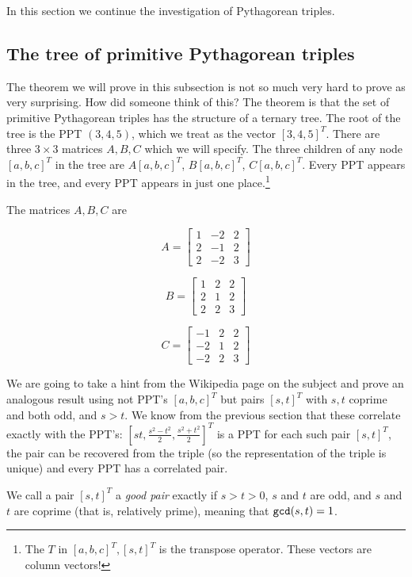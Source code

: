 \documentclass[12pt]{article}
\begin{document}
In this section we continue the investigation of Pythagorean triples.

\subsection{The tree of primitive Pythagorean triples}

The theorem we will prove in this subsection is not so much very hard to prove as very surprising.   How did someone think of this?   The theorem is that the set of primitive Pythagorean triples has the structure of a ternary tree.   The root of the tree is the PPT $(3,4,5)$, which we treat as the vector $[3,4,5]^T$.  There are three $3 \times 3$ matrices $A,B,C$ which we will specify.   The three children of any node $[a,b,c]^T$ in the tree are $A[a,b,c]^T$, $B[a,b,c]^T$, $C[a,b,c]^T$.   Every PPT appears in the tree, and every PPT appears in just one place.\footnote{The $T$ in $[a,b,c]^T, [s,t]^T$ is the transpose operator.   These vectors are column vectors!}

The matrices $A,B,C$ are

$$A=\left[\begin{array}{ccc} 1 & -2 & 2 \\ 2 & -1 & 2\\2 & -2 & 3\end{array}\right]$$

$$B=\left[\begin{array}{ccc} 1 & 2 & 2 \\ 2 & 1 & 2\\2 & 2 & 3\end{array}\right]$$

$$C=\left[\begin{array}{ccc} -1 & 2 & 2 \\ -2 & 1 & 2\\-2 & 2 & 3\end{array}\right]$$

We are going to take a hint from the Wikipedia page on the subject and prove an analogous result using not PPT's $[a,b,c]^T$ but pairs $[s,t]^T$ with $s,t$ coprime and both odd, and $s>t$.  We know from the previous section that these correlate exactly with the PPT's:  $[st,\frac{s^2-t^2}2,\frac{s^2+t^2}2]^T$ is a PPT for each such pair $[s,t]^T$, the pair can be recovered
from the triple (so the representation of the triple is unique) and every PPT has a correlated pair.

We call a pair $[s,t]^T$ a {\em good pair\/} exactly if $s>t>0$, $s$ and $t$ are odd, and $s$ and $t$ are coprime (that is, relatively prime), meaning that ${\tt gcd}(s,t)=1$.
\end{document}
